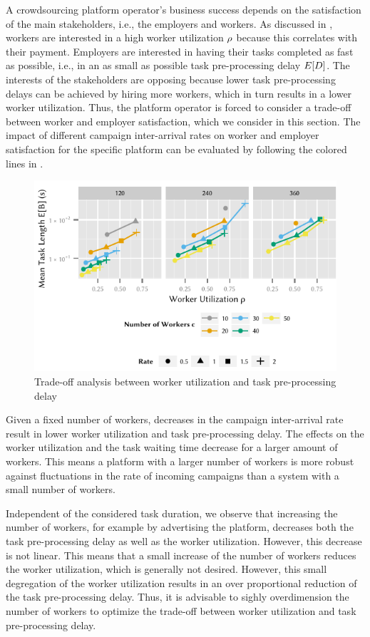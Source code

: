 A crowdsourcing platform operator's business success depends on the satisfaction of the main stakeholders, i.e., the employers and workers.
As discussed in , workers are interested in a high worker utilization \(\rho\) because this correlates with their payment.
Employers are interested in having their tasks completed as fast as possible, i.e., in an as small as possible task pre-processing delay \(E[D]\).
The interests of the stakeholders are opposing because lower task pre-processing delays can be achieved by hiring more workers, which in turn results in a lower worker utilization.
Thus, the platform operator is forced to consider a trade-off between worker and employer satisfaction, which we consider in this section.
The impact of different campaign inter-arrival rates on worker and employer satisfaction for the specific platform can be evaluated by following the colored lines in .

\begin{figure}
	\centering
	\includegraphics{cloud/crowdsourcing/numerical_evaluation/figures/pareto}
	\caption{Trade-off analysis between worker utilization and task pre-processing delay}
	\label{fig:cloud:crowdsourcing:performance_evaluation:tradeoff:pareto}
\end{figure}

Given a fixed number of workers, decreases in the campaign inter-arrival rate result in lower worker utilization and task pre-processing delay.
The effects on the worker utilization and the task waiting time decrease for a larger amount of workers.
This means a platform with a larger number of workers is more robust against fluctuations in the rate of incoming campaigns than a system with a small number of workers.

Independent of the considered task duration, we observe that increasing the number of workers, for example by advertising the platform, decreases both the task pre-processing delay as well as the worker utilization.
However, this decrease is not linear.
This means that a small increase of the number of workers reduces the worker utilization, which is generally not desired.
However, this small degregation of the worker utilization results in an over proportional reduction of the task pre-processing delay.
Thus, it is advisable to sighly overdimension the number of workers to optimize the trade-off between worker utilization and task pre-processing delay.
